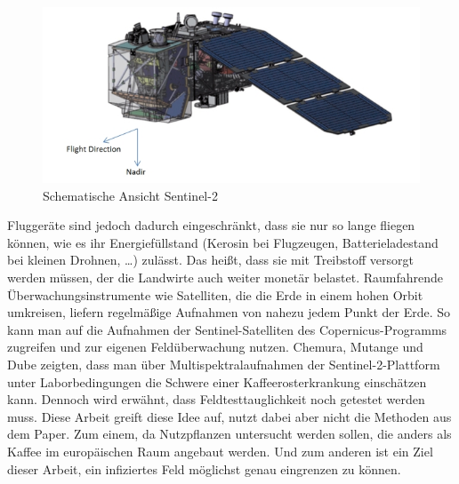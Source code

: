 \\\\
\begin{figure}[ht]
  \centering
  \includegraphics[width=.7\textwidth]{pics/sentinel.jpg}
  \caption[Schematische Ansicht Sentinel-2]{Schematische Ansicht Sentinel-2\cite{ref:sentinel:descr}}
  \label{fig:anthracnose}
\end{figure}
\noindent
Fluggeräte sind jedoch dadurch eingeschränkt, dass sie nur so lange fliegen können, wie es ihr Energiefüllstand (Kerosin bei Flugzeugen, Batterieladestand bei kleinen Drohnen, \dots) zulässt. Das heißt, dass sie mit Treibstoff versorgt werden müssen, der die Landwirte auch weiter monetär belastet. Raumfahrende Überwachungsinstrumente wie Satelliten, die die Erde in einem hohen Orbit umkreisen, liefern regelmäßige Aufnahmen von nahezu jedem Punkt der Erde. So kann man auf die Aufnahmen der Sentinel-Satelliten des Copernicus-Programms zugreifen und zur eigenen Feldüberwachung nutzen. Chemura, Mutange und Dube zeigten, dass man über Multispektralaufnahmen der Sentinel-2-Plattform unter Laborbedingungen die Schwere einer Kaffeerosterkrankung einschätzen kann.\cite[S. 877]{ref:chemura} Dennoch wird erwähnt, dass Feldtesttauglichkeit noch getestet werden muss.\cite[S. 859]{ref:chemura} Diese Arbeit greift diese Idee auf, nutzt dabei aber nicht die Methoden aus dem Paper. Zum einem, da Nutzpflanzen untersucht werden sollen, die anders als Kaffee im europäischen Raum angebaut werden. Und zum anderen ist ein Ziel dieser Arbeit, ein infiziertes Feld möglichst genau eingrenzen zu können. 